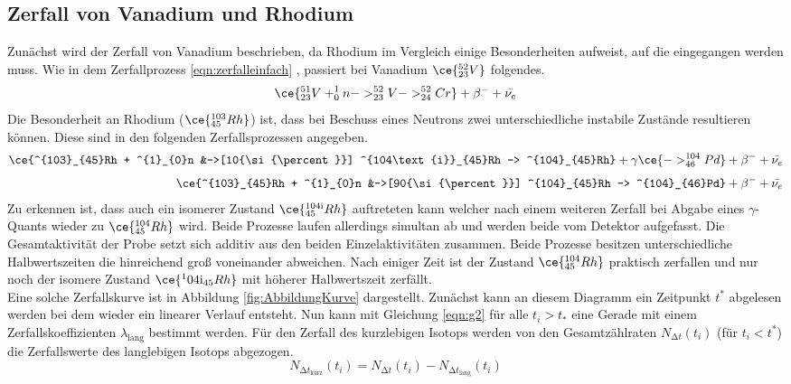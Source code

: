 \subsection{Zerfall von Vanadium und Rhodium}
Zunächst wird der Zerfall von Vanadium beschrieben, da Rhodium im Vergleich einige Besonderheiten aufweist, auf die eingegangen werden muss.
Wie in dem Zerfallprozess \eqref{eqn:zerfalleinfach} , passiert bei Vanadium $\ce{^{52}_{23}V}$ folgendes.
\begin{equation}
\ce{^{51}_{23}V + ^{1}_{0}n -> ^{52}_{23}V -> ^{52}_{24}Cr} + {\beta}^{-} + \bar{\nu_{e}} 
\end{equation}
Die Besonderheit an Rhodium ($\ce{^{103}_{45}Rh}$) ist, dass bei Beschuss eines Neutrons zwei unterschiedliche instabile Zustände resultieren können. 
Diese sind in den folgenden Zerfallsprozessen angegeben.
\begin{align}
\ce{^{103}_{45}Rh + ^{1}_{0}n &->[10{\si{\percent}}] ^{104\text{i}}_{45}Rh -> ^{104}_{45}Rh} + \gamma \ce{-> ^{104}_{46}Pd} + {\beta}^{-} + \bar{\nu_{e}} \\[3pt]
\ce{^{103}_{45}Rh + ^{1}_{0}n &->[90{\si{\percent}}] ^{104}_{45}Rh -> ^{104}_{46}Pd} + {\beta}^{-} + \bar{\nu_{e}} 
\end{align}
Zu erkennen ist, dass auch ein isomerer Zustand $\ce{^{104{\text{i}}}_{45}Rh}$ auftreteten kann welcher nach einem weiteren Zerfall bei Abgabe eines $\gamma$-Quants wieder zu $\ce{^{104}_{45}Rh}$ wird.
Beide Prozesse laufen allerdings simultan ab und werden beide vom Detektor aufgefasst. 
Die Gesamtaktivität der Probe setzt sich additiv aus den beiden Einzelaktivitäten zusammen. Beide Prozesse besitzen unterschiedliche Halbwertszeiten die hinreichend
groß voneinander abweichen. Nach einiger Zeit ist der Zustand $\ce{^{104}_{45}Rh}$ praktisch zerfallen und nur noch der isomere Zustand $\ce{^104{\text{i}}_{45}Rh}$ mit höherer Halbwertszeit zerfällt.
\\
\newline
Eine solche Zerfallskurve ist in Abbildung \ref{fig:AbbildungKurve} dargestellt.
Zunächst kann an diesem Diagramm ein Zeitpunkt $t^{*}$ abgelesen werden bei dem wieder ein linearer Verlauf entsteht. Nun kann mit Gleichung 
\eqref{eqn:g2} für alle $t_{i} > t_{*}$ eine Gerade mit einem Zerfallskoeffizienten $\lambda_{\text{lang}}$ bestimmt werden.
Für den Zerfall des kurzlebigen Isotops werden von den Gesamtzählraten $N_{\increment t}(t_{i})$ (für $t_{i} < t^{*}$) die Zerfallswerte des langlebigen Isotops abgezogen.
\begin{equation}
N_{{\increment t}_{\text{kurz}}}(t_{i}) = N_{\increment t}(t_{i}) - N_{{\increment t}_{\text{lang}}}(t_{i})
\end{equation}
